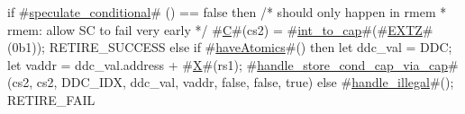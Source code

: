 if #\hyperref[sailRISCVzspeculatezyconditional]{speculate\_conditional}# () == false then {
  /* should only happen in rmem
   * rmem: allow SC to fail very early
   */
  #\hyperref[sailRISCVzC]{C}#(cs2) = #\hyperref[sailRISCVzintzytozycap]{int\_to\_cap}#(#\hyperref[sailRISCVzEXTZ]{EXTZ}#(0b1));
  RETIRE_SUCCESS
} else if #\hyperref[sailRISCVzhaveAtomics]{haveAtomics}#() then {
  let ddc_val = DDC;
  let vaddr = ddc_val.address + #\hyperref[sailRISCVzX]{X}#(rs1);
  #\hyperref[sailRISCVzhandlezystorezycondzycapzyviazycap]{handle\_store\_cond\_cap\_via\_cap}#(cs2, cs2, DDC_IDX, ddc_val, vaddr, false, false, true)
} else {
  #\hyperref[sailRISCVzhandlezyillegal]{handle\_illegal}#();
  RETIRE_FAIL
}
